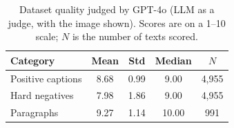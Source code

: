 \begin{table}[t]
\centering
\caption{Dataset quality judged by GPT-4o (LLM as a judge, with the image shown). Scores are on a 1--10 scale; $N$ is the number of texts scored.}
\label{tab:dataset_quality}
\small
\begin{tabular}{lcccc}
\toprule
\textbf{Category} & \textbf{Mean} & \textbf{Std} & \textbf{Median} & \textbf{$N$} \\
\midrule
Positive captions & 8.68 & 0.99 & 9.00 & 4,955 \\
Hard negatives & 7.98 & 1.86 & 9.00 & 4,955 \\
Paragraphs & 9.27 & 1.14 & 10.00 & 991 \\
\bottomrule
\end{tabular}
\end{table}
